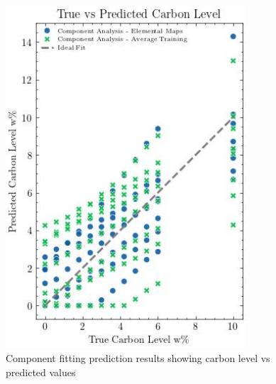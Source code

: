 \begin{figure}[H]
\centering
\includegraphics[width=0.8\textwidth]{../Figures/Analysis/carbon_level_vs_predicted_component_analysis.jpg}
\caption{Component fitting prediction results showing carbon level vs predicted values}
\label{fig:component_predictions}
\end{figure}